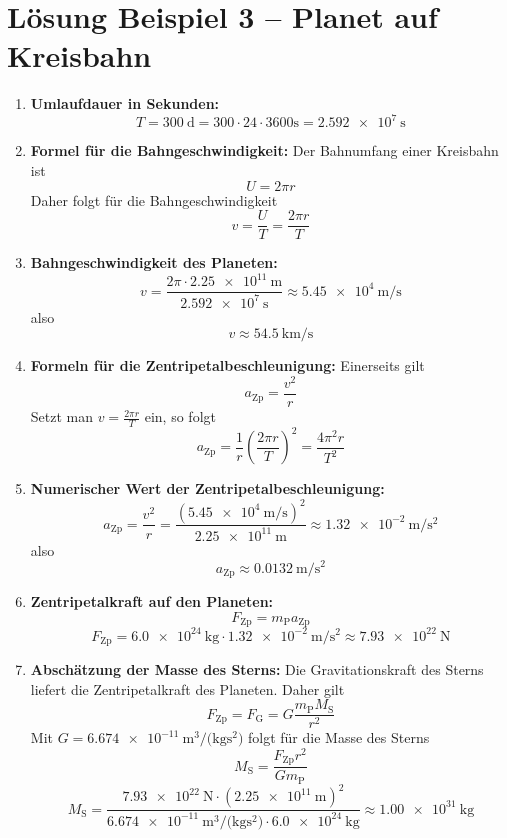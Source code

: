 \documentclass[11pt, a4paper]{article}
\begin{document}
\newpage

\section*{Lösung Beispiel 3 -- Planet auf Kreisbahn}
\begin{enumerate}
    \item \textbf{Umlaufdauer in Sekunden:}
    \[
        T = \SI{300}{\day} = 300 \cdot 24 \cdot 3600 \si{\second} = \SI{2.592e7}{\second}
    \]

    \item \textbf{Formel für die Bahngeschwindigkeit:}
    Der Bahnumfang einer Kreisbahn ist
    \[
        U = 2\pi r
    \]
    Daher folgt für die Bahngeschwindigkeit
    \[
        v = \frac{U}{T} = \frac{2\pi r}{T}
    \]

    \item \textbf{Bahngeschwindigkeit des Planeten:}
    \[
        v = \frac{2\pi \cdot \SI{2.25e11}{\metre}}{\SI{2.592e7}{\second}} \approx \SI{5.45e4}{\metre\per\second}
    \]
    also
    \[
        v \approx \SI{54.5}{\kilo\metre\per\second}
    \]

    \item \textbf{Formeln für die Zentripetalbeschleunigung:}
    Einerseits gilt
    \[
        a_{\text{Zp}} = \frac{v^2}{r}
    \]
    Setzt man $v = \frac{2\pi r}{T}$ ein, so folgt
    \[
        a_{\text{Zp}} = \frac{1}{r} \left(\frac{2\pi r}{T}\right)^2 = \frac{4\pi^2 r}{T^2}
    \]

    \item \textbf{Numerischer Wert der Zentripetalbeschleunigung:}
    \[
        a_{\text{Zp}} = \frac{v^2}{r} = \frac{(\SI{5.45e4}{\metre\per\second})^2}{\SI{2.25e11}{\metre}} \approx \SI{1.32e-2}{\metre\per\second\squared}
    \]
    also
    \[
        a_{\text{Zp}} \approx \SI{0.0132}{\metre\per\second\squared}
    \]

    \item \textbf{Zentripetalkraft auf den Planeten:}
    \[
        F_{\text{Zp}} = m_{\text{P}} a_{\text{Zp}}
    \]
    \[
        F_{\text{Zp}} = \SI{6.0e24}{\kilogram} \cdot \SI{1.32e-2}{\metre\per\second\squared} \approx \SI{7.93e22}{\newton}
    \]

    \item \textbf{Abschätzung der Masse des Sterns:}
    Die Gravitationskraft des Sterns liefert die Zentripetalkraft des Planeten. Daher gilt
    \[
        F_{\text{Zp}} = F_{\text{G}} = G \frac{m_{\text{P}} M_{\text{S}}}{r^2}
    \]
    Mit $G = \SI{6.674e-11}{\metre\cubed\per(\kilogram\second\squared)}$ folgt für die Masse des Sterns
    \[
        M_{\text{S}} = \frac{F_{\text{Zp}} r^2}{G m_{\text{P}}}
    \]
    \[
        M_{\text{S}} = \frac{\SI{7.93e22}{\newton} \cdot (\SI{2.25e11}{\metre})^2}{\SI{6.674e-11}{\metre\cubed\per(\kilogram\second\squared)} \cdot \SI{6.0e24}{\kilogram}} \approx \SI{1.00e31}{\kilogram}
    \]
\end{enumerate}
\end{document}
